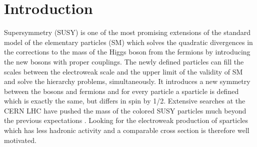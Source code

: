 \section{Introduction}
\label{sect:introduction}

Supersymmetry \cite{Martin:1997ns} (SUSY) is one of the most promising extensions of the 
standard model of the elementary particles (SM) which solves the 
quadratic divergences in the corrections to the mass of the Higgs boson from the fermions by introducing the new
bosons with proper couplings. The newly defined particles can fill the scales between the electroweak scale and 
the upper limit of the validity of SM and solve the  hierarchy problems, simultaneously. 
It introduces a new symmetry between the bosons and fermions and 
for every particle a sparticle is defined which is exactly the same, but differs in spin by 1/2. 
Extensive searches at the CERN LHC have pushed the mass of the colored SUSY particles much beyond the previous expectations \cite{susyPhyRes}. 
Looking for the electroweak production of sparticles which has less hadronic activity and a comparable cross section is therefore well motivated.

